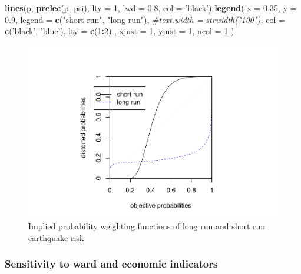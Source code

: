 \documentclass[
]{article}
\newenvironment{Shaded}{\begin{snugshade}}{\end{snugshade}}
\newcommand{\CommentTok}[1]{\textcolor[rgb]{0.56,0.35,0.01}{\textit{#1}}}
\newcommand{\DataTypeTok}[1]{\textcolor[rgb]{0.13,0.29,0.53}{#1}}
\newcommand{\DecValTok}[1]{\textcolor[rgb]{0.00,0.00,0.81}{#1}}
\newcommand{\FloatTok}[1]{\textcolor[rgb]{0.00,0.00,0.81}{#1}}
\newcommand{\KeywordTok}[1]{\textcolor[rgb]{0.13,0.29,0.53}{\textbf{#1}}}
\newcommand{\NormalTok}[1]{#1}
\newcommand{\OperatorTok}[1]{\textcolor[rgb]{0.81,0.36,0.00}{\textbf{#1}}}
\newcommand{\StringTok}[1]{\textcolor[rgb]{0.31,0.60,0.02}{#1}}
\begin{document}
\begin{Shaded}
\begin{Highlighting}[]
\KeywordTok{lines}\NormalTok{(p,}
      \KeywordTok{prelec}\NormalTok{(p, psi),}
      \DataTypeTok{lty =} \DecValTok{1}\NormalTok{,}
      \DataTypeTok{lwd =} \FloatTok{0.8}\NormalTok{,}
      \DataTypeTok{col =} \StringTok{'black'}\NormalTok{)}
\KeywordTok{legend}\NormalTok{(}
  \DataTypeTok{x =} \FloatTok{0.35}\NormalTok{,}
  \DataTypeTok{y =} \FloatTok{0.9}\NormalTok{,}
  \DataTypeTok{legend =} \KeywordTok{c}\NormalTok{(}\StringTok{"short run"}\NormalTok{, }\StringTok{"long run"}\NormalTok{),}
  \CommentTok{#text.width = strwidth("100"),}
  \DataTypeTok{col =} \KeywordTok{c}\NormalTok{(}\StringTok{'black'}\NormalTok{, }\StringTok{'blue'}\NormalTok{),}
  \DataTypeTok{lty =} \KeywordTok{c}\NormalTok{(}\DecValTok{1}\OperatorTok{:}\DecValTok{2}\NormalTok{) ,}
  \DataTypeTok{xjust =} \DecValTok{1}\NormalTok{,}
  \DataTypeTok{yjust =} \DecValTok{1}\NormalTok{,}
  \DataTypeTok{ncol =} \DecValTok{1}
\NormalTok{)}
\end{Highlighting}
\end{Shaded}

\begin{figure}
\centering
\includegraphics{replication_instructions_files/figure-latex/unnamed-chunk-19-1.pdf}
\caption{Implied probability weighting functions of long run and short
run earthquake risk}
\end{figure}

\hypertarget{sensitivity-to-ward-and-economic-indicators}{%
\subsubsection{Sensitivity to ward and economic
indicators}\label{sensitivity-to-ward-and-economic-indicators}}
\end{document}
